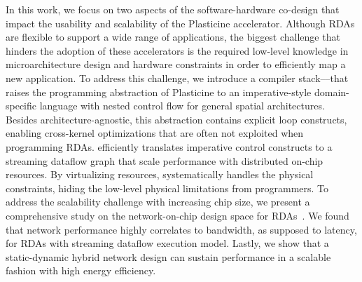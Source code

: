 In this work, we focus on two aspects of the software-hardware co-design that impact the usability
and scalability of the Plasticine accelerator. 
Although RDAs are flexible to support a wide range of applications, 
the biggest challenge that hinders the adoption of these accelerators is 
the required low-level knowledge in microarchitecture design and hardware constraints in
order to efficiently map a new application.
To address this challenge, we introduce a compiler stack--\name--that raises the programming abstraction of
Plasticine to an imperative-style domain-specific language with nested control
flow for general spatial architectures.
Besides architecture-agnostic, this abstraction contains explicit loop constructs, enabling
cross-kernel optimizations that are often not exploited when programming RDAs.
\name efficiently translates imperative control constructs to a streaming
dataflow graph that scale performance with distributed on-chip resources.
By virtualizing resources, \name systematically handles the physical constraints, hiding
the low-level physical limitations from programmers.
To address the scalability challenge with increasing chip size, 
we present a comprehensive study on the network-on-chip design space for RDAs~\cite{network}.
We found that network performance highly correlates to bandwidth, as supposed to latency,
for RDAs with streaming dataflow execution model.
Lastly, we show that a static-dynamic hybrid network design can sustain performance in a 
scalable fashion with high energy efficiency.
